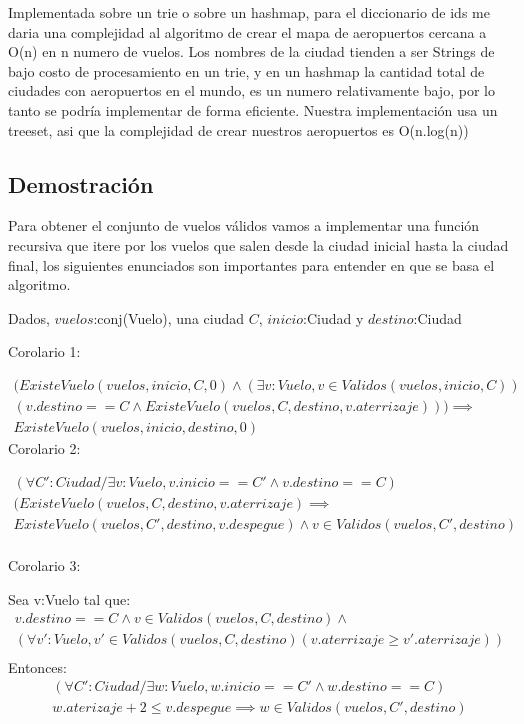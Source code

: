 Implementada sobre un trie o sobre un hashmap, para el diccionario de ids me daria una complejidad al algoritmo de crear el mapa de aeropuertos cercana a O(n) en n numero de vuelos. Los nombres de la ciudad tienden a ser Strings de bajo costo de procesamiento en un trie, y en un hashmap la cantidad total de ciudades con aeropuertos en el mundo, es un numero relativamente bajo, por lo tanto se podr\'ia implementar de forma eficiente.
Nuestra implementaci\'on usa un treeset, asi que la complejidad de crear nuestros aeropuertos es O(n.log(n))



\newpage

\subsection{Demostración}
Para obtener el conjunto de vuelos v\'alidos vamos a implementar una funci\'on recursiva que itere por los vuelos que salen desde la ciudad inicial hasta la ciudad final, los siguientes enunciados son importantes para entender en que se basa el algoritmo.

Dados, $vuelos$:conj(Vuelo), una ciudad $C$, $inicio$:Ciudad y $destino$:Ciudad

Corolario 1:

\begin{align*}
(ExisteVuelo(vuelos,inicio, C, 0) \wedge (\exists v:Vuelo, v \in Validos(vuelos,inicio,C))\\
(v.destino == C \wedge ExisteVuelo(vuelos,C, destino, v.aterrizaje))) \implies \\ ExisteVuelo(vuelos,inicio, destino, 0)
\end{align*}
Corolario 2:

\begin{align*}
(\forall C':Ciudad / \exists v:Vuelo, v.inicio == C' \wedge v.destino == C)\\
(ExisteVuelo(vuelos,C,destino,v.aterrizaje) \implies \\
ExisteVuelo(vuelos,C',destino,v.despegue) \wedge v \in Validos(vuelos,C',destino)
\end{align*}
\begin{align*}
\end{align*}


Corolario 3:

Sea v:Vuelo tal que:
\begin{align*}
v.destino == C \wedge v \in Validos(vuelos,C,destino) \wedge\\
(\forall v':Vuelo, v' \in Validos(vuelos,C,destino)(v.aterrizaje \geq v'.aterrizaje))\\
\end{align*}
Entonces:
\begin{align*}
(\forall C':Ciudad / \exists w:Vuelo, w.inicio == C' \wedge w.destino == C)\\
w.aterizaje + 2 \leq v.despegue \implies w \in Validos(vuelos,C',destino) 
\end{align*}


